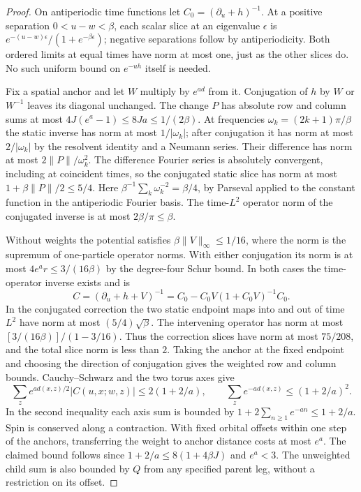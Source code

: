 \documentclass[11pt]{article}
\begin{document}
\begin{proof}
On antiperiodic time functions let $C_0=(\partial_u+h)^{-1}$. At a positive separation $0<u-w<\beta$, each scalar slice at an eigenvalue $\epsilon$ is $e^{-(u-w)\epsilon}/(1+e^{-\beta\epsilon})$; negative separations follow by antiperiodicity. Both ordered limits at equal times have norm at most one, just as the other slices do. No such uniform bound on $e^{-u h}$ itself is needed.

Fix a spatial anchor and let $W$ multiply by $e^{a d}$ from it. Conjugation of $h$ by $W$ or $W^{-1}$ leaves its diagonal unchanged. The change $P$ has absolute row and column sums at most $4J(e^a-1)\le 8Ja\le 1/(2\beta)$. At frequencies $\omega_k=(2k+1)\pi/\beta$ the static inverse has norm at most $1/|\omega_k|$; after conjugation it has norm at most $2/|\omega_k|$ by the resolvent identity and a Neumann series. Their difference has norm at most $2\|P\|/\omega_k^2$. The difference Fourier series is absolutely convergent, including at coincident times, so the conjugated static slice has norm at most $1+\beta\|P\|/2\le 5/4$. Here $\beta^{-1}\sum_k \omega_k^{-2}=\beta/4$, by Parseval applied to the constant function in the antiperiodic Fourier basis. The time-$L^2$ operator norm of the conjugated inverse is at most $2\beta/\pi\le\beta$.

Without weights the potential satisfies $\beta\|V\|_\infty\le 1/16$, where the norm is the supremum of one-particle operator norms. With either conjugation its norm is at most $4e^a r\le 3/(16\beta)$ by the degree-four Schur bound. In both cases the time-operator inverse exists and is
\begin{equation}\label{eq:resolvent}
 C=(\partial_u+h+V)^{-1}=C_0-C_0 V(1+C_0V)^{-1}C_0.
\end{equation}
In the conjugated correction the two static endpoint maps into and out of time $L^2$ have norm at most $(5/4)\sqrt\beta$. The intervening operator has norm at most $[3/(16\beta)]/(1-3/16)$. Thus the correction slices have norm at most $75/208$, and the total slice norm is less than $2$. Taking the anchor at the fixed endpoint and choosing the direction of conjugation gives the weighted row and column bounds. Cauchy--Schwarz and the two torus axes give
\[
 \sum_z e^{a d(x,z)/2}|C(u,x;w,z)|\le 2(1+2/a),
 \qquad \sum_z e^{-a d(x,z)}\le (1+2/a)^2.
\]
In the second inequality each axis sum is bounded by $1+2\sum_{n\ge 1}e^{-an}\le 1+2/a$. Spin is conserved along a contraction. With fixed orbital offsets within one step of the anchors, transferring the weight to anchor distance costs at most $e^a$. The claimed bound follows since $1+2/a\le 8(1+4\beta J)$ and $e^a<3$. The unweighted child sum is also bounded by $Q$ from any specified parent leg, without a restriction on its offset.


\end{proof}
\end{document}
